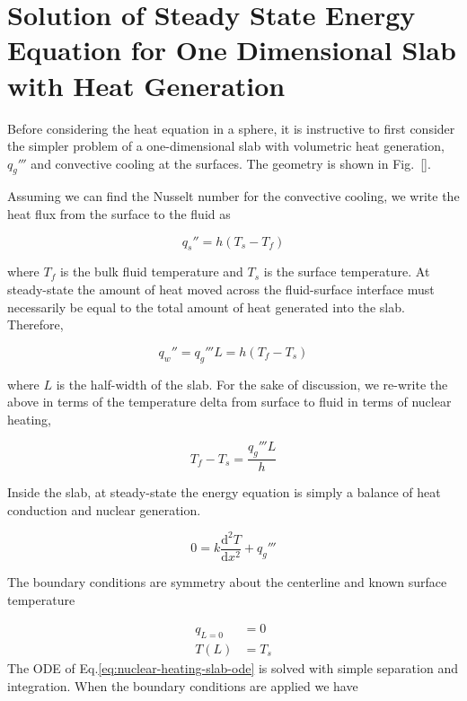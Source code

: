 \chapter{Solution of Steady State Energy Equation for One Dimensional Slab with Heat Generation}\label{sec:analytic-slab}

Before considering the heat equation in a sphere, it is instructive to first consider the simpler problem of a one-dimensional slab with volumetric heat generation, $q_g'''$ and convective cooling at the surfaces. The geometry is shown in Fig.~\ref{}.

Assuming we can find the Nusselt number for the convective cooling, we write the heat flux from the surface to the fluid as

\begin{equation}
	q_s'' = h(T_s - T_f)	
\end{equation}

where $T_f$ is the bulk fluid temperature and $T_s$ is the surface temperature. At steady-state the amount of heat moved across the fluid-surface interface must necessarily be equal to the total amount of heat generated into the slab. Therefore,

\begin{equation}
	q_w'' = q_g'''L = h(T_f-T_s)
\end{equation}

where $L$ is the half-width of the slab. For the sake of discussion, we re-write the above in terms of the temperature delta from surface to fluid in terms of nuclear heating,

\begin{equation}\label{eq:fluid-delta}
	T_f-T_s = \frac{q_g'''L}{h}
\end{equation}

Inside the slab, at steady-state the energy equation is simply a balance of heat conduction and nuclear generation. 

\begin{equation}\label{eq:nuclear-heating-slab-ode}
	0 = k\frac{\mathrm{d}^2T}{\mathrm{d}x^2} + q_g'''
\end{equation}

The boundary conditions are symmetry about the centerline and known surface temperature

\begin{subequations}
\begin{align}
	q_{L=0} &= 0 \\
	T(L) &= T_s
\end{align}
\end{subequations}
The ODE of Eq.\ref{eq:nuclear-heating-slab-ode} is solved with simple separation and integration. When the boundary conditions are applied we have

